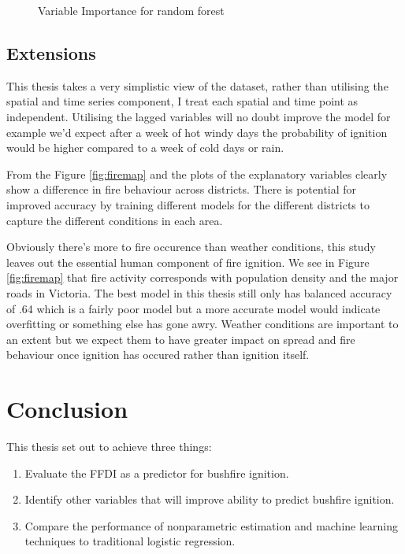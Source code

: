 \documentclass[11pt,a4paper]{article}
\begin{document}
\begin{figure}[h]
	\centering 
	\caption{Variable Importance for random forest} 
	\label{fig:rocrf} 
\end{figure}

\subsection{Extensions}

This thesis takes a very simplistic view of the dataset, rather than utilising the spatial and time series component, I treat each spatial and time point as independent. Utilising the lagged variables will no doubt improve the model for example we'd expect after a week of hot windy days the probability of ignition would be higher compared to a week of cold days or rain. 

From the Figure \ref{fig:firemap} and the plots of the explanatory variables clearly show a difference in fire behaviour across districts. There is potential for improved accuracy by training different models for the different districts to capture the different conditions in each area. 

Obviously there's more to fire occurence than weather conditions, this study leaves out the essential human component of fire ignition. We see in Figure \ref{fig:firemap} that fire activity corresponds with population density and the major roads in Victoria. The best model in this thesis still only has balanced accuracy of .64 which is a fairly poor model but a more accurate model would indicate overfitting or something else has gone awry.  Weather conditions are important to an extent but we expect them to have greater impact on spread and fire behaviour once ignition has occured rather than ignition itself. 


\section{Conclusion}

This thesis set out to achieve three things:
\begin{enumerate}
\item Evaluate the FFDI as a predictor for bushfire ignition.
\item Identify other variables that will improve ability to predict bushfire ignition.
\item Compare the performance of nonparametric estimation and machine learning techniques to traditional logistic regression.
\end{enumerate}
\end{document}
